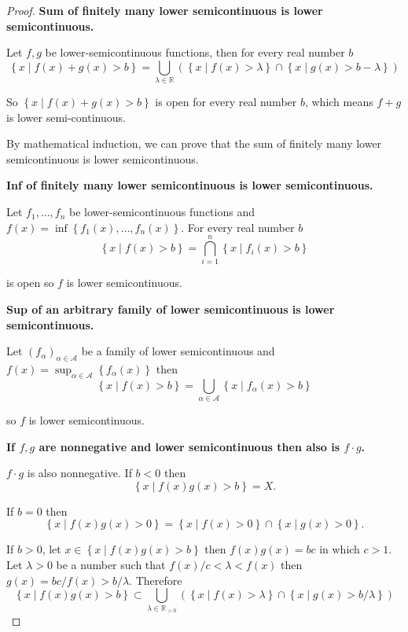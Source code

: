 \begin{proof}
    \textbf{Sum of finitely many lower semicontinuous is lower semicontinuous.}

    Let \( f, g \) be lower-semicontinuous functions, then for every real number \( b \)
    \[
        \left\{ x \mid f(x) + g(x) > b \right\} = \bigcup_{\lambda \in \mathbb{R}} (\left\{ x \mid f(x) > \lambda \right\} \cap \left\{ x \mid g(x) > b - \lambda \right\})
    \]

    So \( \left\{ x \mid f(x) + g(x) > b \right\} \) is open for every real number \( b \), which means \( f + g \) is lower semi-continuous.

    By mathematical induction, we can prove that the sum of finitely many lower semicontinuous is lower semicontinuous.

    \textbf{Inf of finitely many lower semicontinuous is lower semicontinuous.}

    Let \( f_{1}, \ldots, f_{n} \) be lower-semicontinuous functions and \( f(x) = \inf\left\{ f_{1}(x), \ldots, f_{n}(x) \right\} \). For every real number \( b \)
    \[
        \left\{ x \mid f(x) > b \right\} = \bigcap^{n}_{i=1} \left\{ x \mid f_{i}(x) > b \right\}
    \]

    is open so \( f \) is lower semicontinuous.

    \textbf{Sup of an arbitrary family of lower semicontinuous is lower semicontinuous.}

    Let \( {(f_{\alpha})}_{\alpha\in\mathscr{A}} \) be a family of lower semicontinuous and \( f(x) = \sup_{\alpha\in\mathscr{A}}\left\{ f_{\alpha}(x)  \right\} \) then
    \[
        \left\{ x \mid f(x) > b \right\} = \bigcup_{\alpha\in\mathscr{A}} \left\{ x \mid f_{\alpha}(x) > b \right\}
    \]

    so \( f \) is lower semicontinuous.

    \textbf{If \( f, g \) are nonnegative and lower semicontinuous then also is \( f\cdot g \).}

    \( f\cdot g \) is also nonnegative. If \( b < 0 \) then
    \[
        \left\{ x \mid f(x)g(x) > b \right\} = X.
    \]

    If \( b = 0 \) then
    \[
        \left\{ x \mid f(x)g(x) > 0 \right\} = \left\{ x \mid f(x) > 0 \right\} \cap \left\{ x \mid g(x) > 0 \right\}.
    \]

    If \( b > 0 \), let \( x \in \left\{ x \mid f(x)g(x) > b \right\} \) then \( f(x)g(x) = bc \) in which \( c > 1 \). Let \( \lambda > 0 \) be a number such that \( f(x)/c < \lambda < f(x) \) then \( g(x) = bc/f(x) > b/\lambda \). Therefore
    \[
        \left\{ x \mid f(x)g(x) > b \right\} \subset \bigcup_{\lambda \in \mathbb{R}_{> 0}} (\left\{ x \mid f(x) > \lambda \right\} \cap \left\{ x \mid g(x) > b/\lambda \right\})
    \]


\end{proof}

